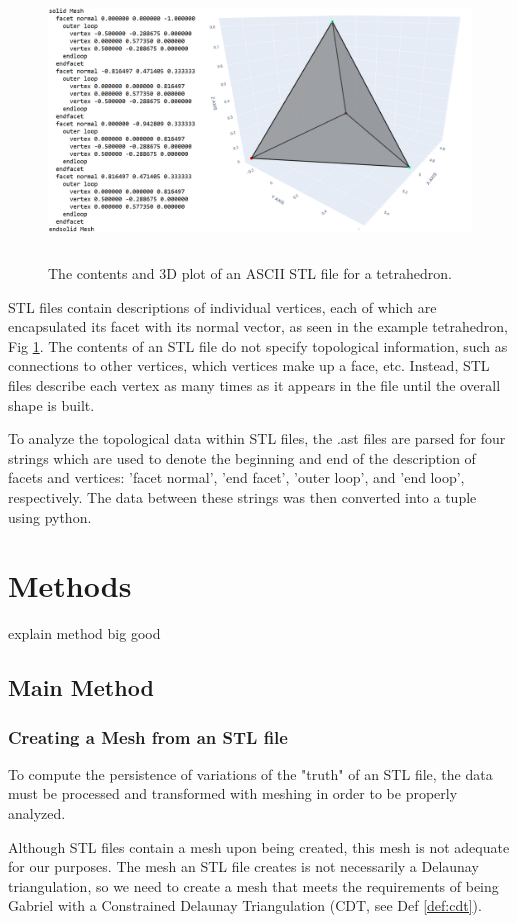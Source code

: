 \documentclass[ma]{uncgdissertationexp}
\theoremstyle{plain}
\theoremstyle{definition}
\theoremstyle{remark}
\begin{document}
\begin{figure}[H]
    \begin{center}
    \includegraphics[height=2.9in]{tetrahedron_ast_code_and_plot.png}
    \caption{The contents and 3D plot of an ASCII STL file for a tetrahedron.}
    \label{fig:ast_tetrahedron}
    \end{center}
\end{figure}
\vspace{-7.5mm}

STL files contain descriptions of individual vertices, each of which are encapsulated its facet with its normal vector, as seen in the example tetrahedron, Fig \ref{fig:ast_tetrahedron}. The contents of an STL file do not specify topological information, such as connections to other vertices, which vertices make up a face, etc. Instead, STL files describe each vertex as many times as it appears in the file until the overall shape is built.

To analyze the topological data within STL files, the .ast files are parsed for four strings which are used to denote the beginning and end of the description of facets and vertices: 'facet normal', 'end facet', 'outer loop', and 'end loop', respectively. The data between these strings was then converted into a tuple using python.


\chapter{Methods}\label{chap:methods}

explain method big good

\section{Main Method}
\subsection{Creating a Mesh from an STL file}
\par To compute the persistence of variations of the "truth" of an STL file, the data must be processed and transformed with meshing in order to be properly analyzed.
\par Although STL files contain a mesh upon being created, this mesh is not adequate for our purposes. The mesh an STL file creates is not necessarily a Delaunay triangulation, so we need to create a mesh that meets the requirements of being Gabriel with a Constrained Delaunay Triangulation (CDT, see Def \ref{def:cdt}). 
\end{document}
